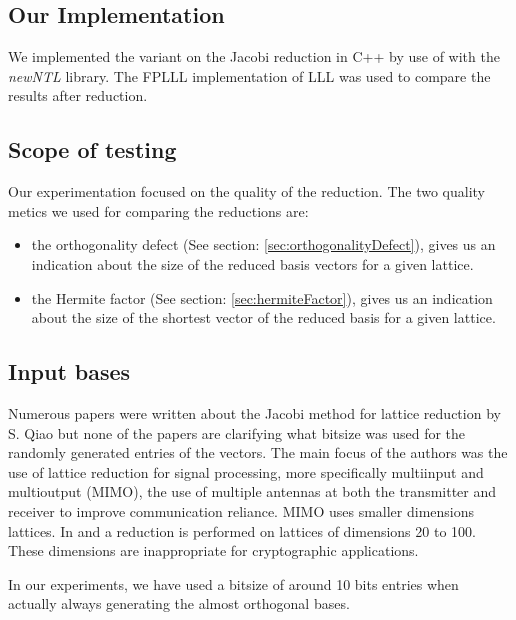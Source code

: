 \documentclass[10pt, a4paper]{article}
\newcommand{\my}[1]{{\color{blue} #1 }}
\begin{document}
\subsection{Our Implementation}

We implemented the \my{variant on the} Jacobi reduction in C++ \my{by use of} with the \emph{newNTL} library. The FPLLL implementation \my{of LLL} was used \my{to compare the results after reduction.}

\subsection{Scope of testing}

Our experimentation focused on the quality of the reduction. The two quality \my{metics} we used for comparing the reductions are:

\begin{itemize}
\item the orthogonality defect (See section: \ref{sec:orthogonalityDefect}), gives us an indication about the size of the reduced basis vectors for a given lattice.
\item the Hermite factor (See section: \ref{sec:hermiteFactor}), gives us an indication about the size of the shortest vector of the reduced basis for a given lattice.
\end{itemize}

\subsection{Input bases}
Numerous papers were written about the Jacobi method for lattice reduction by S. Qiao \cite{originalJacobiMethodLatticeBasisReduction}\cite{complexityAnalysisOfJacobiMethod}\cite{enhancedJacobi} but none of the papers are clarifying what bitsize was used for the randomly generated entries of the vectors. The main focus of the authors was the use of lattice reduction for signal processing, more specifically multiinput and multioutput (MIMO), the use of multiple antennas at both the transmitter and receiver to improve communication reliance. MIMO uses smaller dimensions lattices. \my{In} \cite{enhancedJacobi} and \cite{tian2014hybrid} \my{a reduction is performed on} lattices of dimensions 20 to 100. These dimensions are inappropriate for cryptographic applications.

In our experiments, we have used a bitsize of around 10 bits entries when \my{actually always} generating the almost orthogonal bases.
\end{document}
